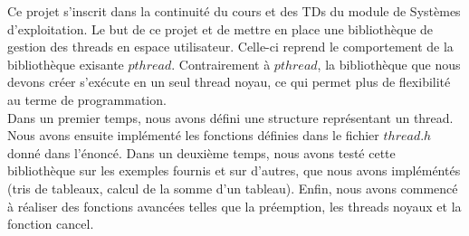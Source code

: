 Ce projet s'inscrit dans la continuité du cours et des TDs du module de Systèmes d'exploitation. Le but de ce projet et de mettre en place une bibliothèque de gestion des threads en espace utilisateur. Celle-ci reprend le comportement de la bibliothèque exisante $pthread$. Contrairement à $pthread$, la bibliothèque que nous devons créer s'exécute en un seul thread noyau, ce qui permet plus de flexibilité au terme de programmation. \\
\indent Dans un premier temps, nous avons défini une structure représentant un thread. Nous avons ensuite implémenté les fonctions définies dans le fichier $thread.h$ donné dans l'énoncé. Dans un deuxième temps, nous avons testé cette bibliothèque sur les exemples fournis et sur d'autres, que nous avons impléméntés (tris de tableaux, calcul de la somme d'un tableau). Enfin, nous avons commencé à réaliser des fonctions avancées telles que la préemption, les threads noyaux et la fonction cancel. 

